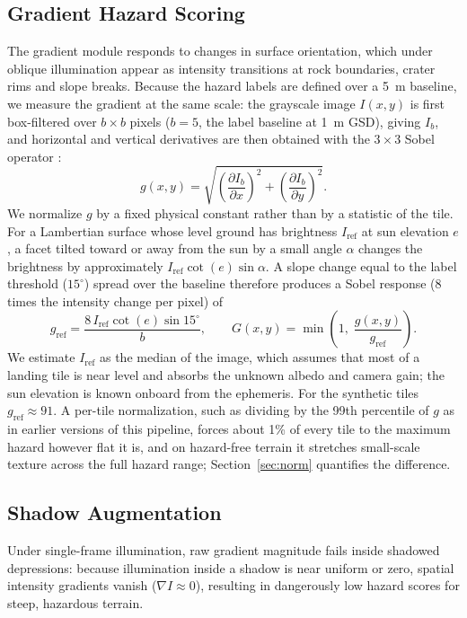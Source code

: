 \documentclass{article}
\begin{document}
\subsection{Gradient Hazard Scoring}
The gradient module responds to changes in surface orientation, which under oblique illumination appear as intensity transitions at rock boundaries, crater rims and slope breaks. Because the hazard labels are defined over a 5~m baseline, we measure the gradient at the same scale: the grayscale image $I(x,y)$ is first box-filtered over $b \times b$ pixels ($b = 5$, the label baseline at 1~m GSD), giving $I_b$, and horizontal and vertical derivatives are then obtained with the $3 \times 3$ Sobel operator \cite{sobel1968}:
\begin{equation}
    g(x,y) = \sqrt{\left(\frac{\partial I_b}{\partial x}\right)^2 + \left(\frac{\partial I_b}{\partial y}\right)^2}.
\end{equation}
We normalize $g$ by a fixed physical constant rather than by a statistic of the tile. For a Lambertian surface whose level ground has brightness $I_{\text{ref}}$ at sun elevation $e$, a facet tilted toward or away from the sun by a small angle $\alpha$ changes the brightness by approximately $I_{\text{ref}} \cot(e) \sin\alpha$. A slope change equal to the label threshold ($15^\circ$) spread over the baseline therefore produces a Sobel response (8 times the intensity change per pixel) of
\begin{equation}
    g_{\text{ref}} = \frac{8\, I_{\text{ref}} \cot(e) \sin 15^\circ}{b},
    \qquad
    G(x,y) = \min\!\left(1,\; \frac{g(x,y)}{g_{\text{ref}}}\right).
\end{equation}
We estimate $I_{\text{ref}}$ as the median of the image, which assumes that most of a landing tile is near level and absorbs the unknown albedo and camera gain; the sun elevation is known onboard from the ephemeris. For the synthetic tiles $g_{\text{ref}} \approx 91$. A per-tile normalization, such as dividing by the 99th percentile of $g$ as in earlier versions of this pipeline, forces about 1\% of every tile to the maximum hazard however flat it is, and on hazard-free terrain it stretches small-scale texture across the full hazard range; Section~\ref{sec:norm} quantifies the difference.

\subsection{Shadow Augmentation}
Under single-frame illumination, raw gradient magnitude fails inside shadowed depressions: because illumination inside a shadow is near uniform or zero, spatial intensity gradients vanish ($\nabla I \approx 0$), resulting in dangerously low hazard scores for steep, hazardous terrain.
\end{document}

